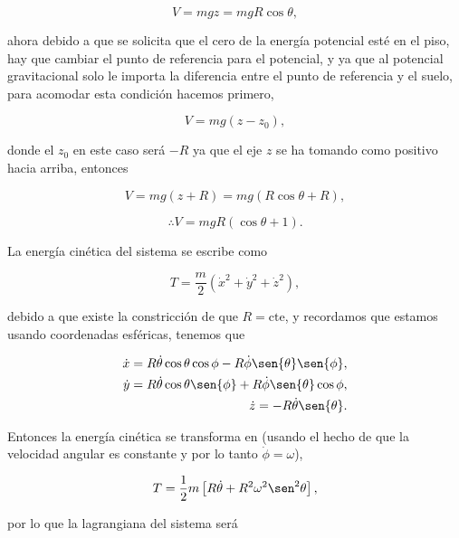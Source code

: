\documentclass[a4paper,10pt]{article}
\numberwithin{equation}{section}
\begin{document}
\begin{equation}
 V = mgz = mgR\cos{\theta},
\end{equation}

ahora debido a que se solicita que el cero de la energía potencial esté en el piso, 
hay que cambiar el punto de referencia para el potencial, y ya que al potencial 
gravitacional solo le importa la diferencia entre el punto de referencia y el suelo, 
para acomodar esta condición hacemos primero,

\begin{equation}
 V = mg(z - z_0),
\end{equation}

donde el $z_0$ en este caso será $-R$ ya que el eje $z$ se ha tomando como positivo 
hacia arriba, entonces 

\begin{equation}
 V = mg(z + R) = mg(R\cos{\theta} + R),
\end{equation}

\begin{equation}
 \therefore V = mgR(\cos{\theta} + 1).
\end{equation}

La energía cinética del sistema se escribe como 

\begin{equation}
 T = \frac{m}{2}(\dot{x}^2 + \dot{y}^2 + \dot{z}^2),
\end{equation}

debido a que existe la constricción de que $R = \text{cte}$, y recordamos que 
estamos usando coordenadas esféricas, tenemos que 

\begin{align*}
 \dot{x} = R\dot{\theta}\cos{\theta}\cos{\phi} - R\dot{\phi}\sen{\theta}\sen{\phi}, \\
 \dot{y} = R\dot{\theta}\cos{\theta}\sen{\phi} + R\dot{\phi}\sen{\theta}\cos{\phi}, \\
 \dot{z} = - R\dot{\theta}\sen{\theta}.
\end{align*}

Entonces la energía cinética se transforma en (usando el hecho de que la velocidad 
angular es constante y por lo tanto $\dot{\phi} = \omega$),

\begin{equation}
 T = \frac{1}{2}m\left[R\dot{\theta} + R^2\omega^2\sen^2{\theta} \right],
\end{equation}

por lo que la lagrangiana del sistema será
\end{document}
